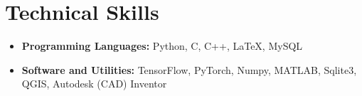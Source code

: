 \section*{Technical Skills}
\begin{itemize}

\setlength\itemsep{0pt}
\item \textbf{Programming Languages:} Python, C, C++, \LaTeX, MySQL
\item \textbf{Software and Utilities:} TensorFlow, PyTorch, Numpy, MATLAB, Sqlite3, QGIS, Autodesk (CAD) Inventor

\end{itemize}

